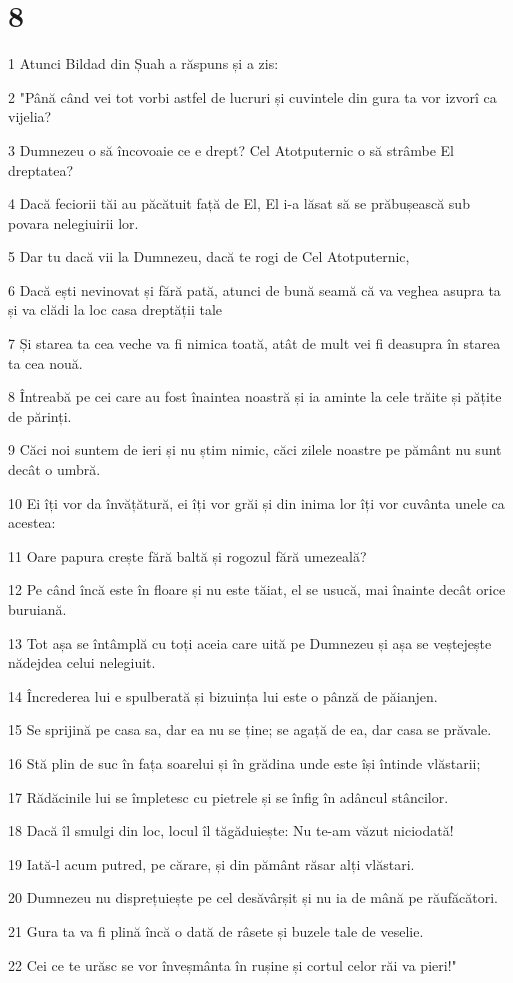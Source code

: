\chapter{8}

\par 1 Atunci Bildad din Șuah a răspuns și a zis:
\par 2 "Până când vei tot vorbi astfel de lucruri și cuvintele din gura ta vor izvorî ca vijelia?
\par 3 Dumnezeu o să încovoaie ce e drept? Cel Atotputernic o să strâmbe El dreptatea?
\par 4 Dacă feciorii tăi au păcătuit față de El, El i-a lăsat să se prăbușească sub povara nelegiuirii lor.
\par 5 Dar tu dacă vii la Dumnezeu, dacă te rogi de Cel Atotputernic,
\par 6 Dacă ești nevinovat și fără pată, atunci de bună seamă că va veghea asupra ta și va clădi la loc casa dreptății tale
\par 7 Și starea ta cea veche va fi nimica toată, atât de mult vei fi deasupra în starea ta cea nouă.
\par 8 Întreabă pe cei care au fost înaintea noastră și ia aminte la cele trăite și pățite de părinți.
\par 9 Căci noi suntem de ieri și nu știm nimic, căci zilele noastre pe pământ nu sunt decât o umbră.
\par 10 Ei îți vor da învățătură, ei îți vor grăi și din inima lor îți vor cuvânta unele ca acestea:
\par 11 Oare papura crește fără baltă și rogozul fără umezeală?
\par 12 Pe când încă este în floare și nu este tăiat, el se usucă, mai înainte decât orice buruiană.
\par 13 Tot așa se întâmplă cu toți aceia care uită pe Dumnezeu și așa se veștejește nădejdea celui nelegiuit.
\par 14 Încrederea lui e spulberată și bizuința lui este o pânză de păianjen.
\par 15 Se sprijină pe casa sa, dar ea nu se ține; se agață de ea, dar casa se prăvale.
\par 16 Stă plin de suc în fața soarelui și în grădina unde este își întinde vlăstarii;
\par 17 Rădăcinile lui se împletesc cu pietrele și se înfig în adâncul stâncilor.
\par 18 Dacă îl smulgi din loc, locul îl tăgăduiește: Nu te-am văzut niciodată!
\par 19 Iată-l acum putred, pe cărare, și din pământ răsar alți vlăstari.
\par 20 Dumnezeu nu disprețuiește pe cel desăvârșit și nu ia de mână pe răufăcători.
\par 21 Gura ta va fi plină încă o dată de râsete și buzele tale de veselie.
\par 22 Cei ce te urăsc se vor înveșmânta în rușine și cortul celor răi va pieri!"

